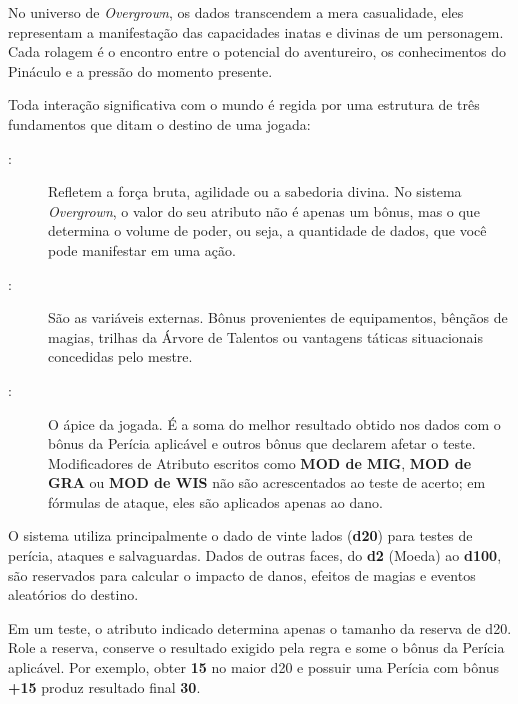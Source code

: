 
No universo de \textit{Overgrown}, os dados transcendem a mera casualidade, eles representam a manifestação das capacidades inatas e divinas de um personagem. Cada rolagem é o encontro entre o potencial do aventureiro, os conhecimentos do Pináculo e a pressão do momento presente.

Toda interação significativa com o mundo é regida por uma estrutura de três fundamentos que ditam o destino de uma jogada:

\begin{description}
    \item[:] Refletem a força bruta, agilidade ou a sabedoria divina. No sistema \textit{Overgrown}, o valor do seu atributo não é apenas um bônus, mas o que determina o volume de poder, ou seja, a quantidade de dados, que você pode manifestar em uma ação.
    
    \item[:] São as variáveis externas. Bônus provenientes de equipamentos, bênçãos de magias, trilhas da Árvore de Talentos ou vantagens táticas situacionais concedidas pelo mestre.
    
    \item[:] O ápice da jogada. É a soma do melhor resultado obtido nos dados com o bônus da Perícia aplicável e outros bônus que declarem afetar o teste. Modificadores de Atributo escritos como \textbf{MOD de MIG}, \textbf{MOD de GRA} ou \textbf{MOD de WIS} não são acrescentados ao teste de acerto; em fórmulas de ataque, eles são aplicados apenas ao dano.
\end{description}

O sistema utiliza principalmente o dado de vinte lados (\textbf{d20}) para testes de perícia, ataques e salvaguardas. Dados de outras faces, do \textbf{d2} (Moeda) ao \textbf{d100}, são reservados para calcular o impacto de danos, efeitos de magias e eventos aleatórios do destino.

Em um teste, o atributo indicado determina apenas o tamanho da reserva de d20. Role a reserva, conserve o resultado exigido pela regra e some o bônus da Perícia aplicável. Por exemplo, obter \textbf{15} no maior d20 e possuir uma Perícia com bônus \textbf{+15} produz resultado final \textbf{30}.

